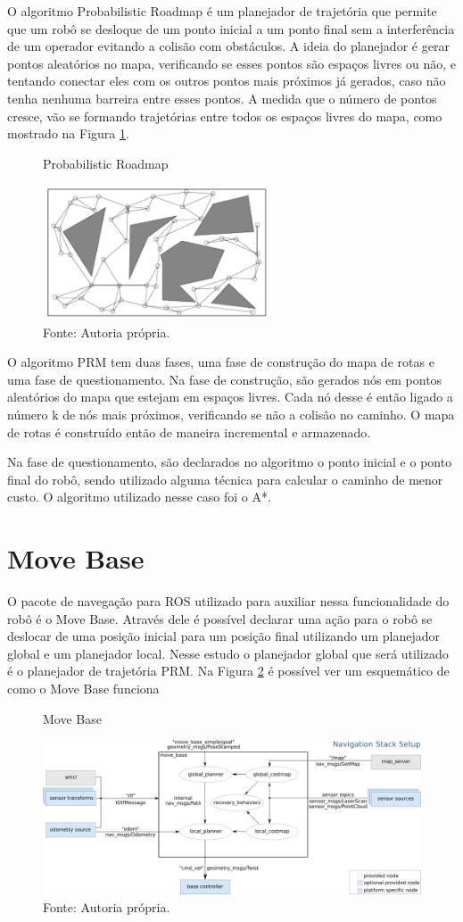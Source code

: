 O algoritmo Probabilistic Roadmap é um planejador de trajetória que permite que um robô se desloque de um ponto inicial a um ponto final sem a interferência de um operador evitando a colisão com obstáculos. A ideia do planejador é gerar pontos aleatórios no mapa, verificando se esses pontos são espaços livres ou não, e tentando conectar eles com os outros pontos mais próximos já gerados, caso não tenha nenhuma barreira entre esses pontos. A medida que o número de pontos cresce, vão se formando trajetórias entre todos os espaços livres do mapa, como mostrado na Figura \ref{fig:prm}.

\begin{figure} [h!]	
   \centering
   \caption{Probabilistic Roadmap}
   \includegraphics[width=0.6\textwidth]{Figures/images.png}
   \caption*{Fonte: Autoria própria.}
   \label{fig:prm}
\end{figure}

O algoritmo PRM tem duas fases, uma fase de construção do mapa de rotas e uma fase de questionamento. Na fase de construção, são gerados nós em pontos aleatórios do mapa que estejam em espaços livres. Cada nó desse é então ligado a número k de nós mais próximos, verificando se não a colisão no caminho. O mapa de rotas é construído então de maneira incremental e armazenado.

Na fase de questionamento, são declarados no algoritmo o ponto inicial e o ponto final do robô, sendo utilizado alguma técnica para calcular o caminho de menor custo. O algoritmo utilizado nesse caso foi o A*.

\section{Move Base}

O pacote de navegação para ROS utilizado para auxiliar nessa funcionalidade do robô é o Move Base. Através dele é possível declarar uma ação para o robô se deslocar de uma posição inicial para um posição final utilizando um planejador global e um planejador local. Nesse estudo o planejador global que será utilizado é o planejador de trajetória PRM. Na Figura \ref{fig:move} é possível ver um esquemático de como o Move Base funciona

\begin{figure} [h!]	
   \centering
   \caption{Move Base}
   \includegraphics[width=1\textwidth]{Figures/overview_tf.png}
   \caption*{Fonte: Autoria própria.}
   \label{fig:move}
\end{figure}